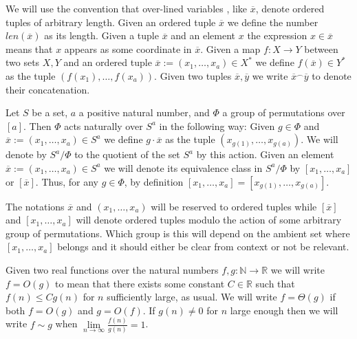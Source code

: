 \documentclass[12pt,notitlepage,a4paper]{article}
\theoremstyle{definition}
\newcommand{\R}{\mathbb{R}}
\newcommand{\N}{\mathbb{N}}
\newcommand{\Ln}{\lim\limits_{n\to \infty}}
\begin{document}
We will use the convention that over-lined variables
, like $\overline{x}$, denote ordered tuples of arbitrary length.
Given an ordered tuple $\overline{x}$
we define the number $len(\overline{x})$ as its length. 
Given a tuple $\overline{x}$ and an element $x$ the expression
$x\in \overline{x}$ means that $x$ appears as some coordinate
in $\overline{x}$. 
Given a map $f:X\rightarrow Y$ between two sets $X, Y$ and 
an ordered tuple $\overline{x}:=(x_1,\dots,x_a)\in X^*$ 
we define $f(\overline{x})\in Y^*$ as the tuple 
$(f(x_1),\dots,f(x_a))$.
Given two tuples $\overline{x},\overline{y}$
we write $\overline{x}^\smallfrown \overline{y}$ to denote their 
concatenation.
\par



Let $S$ be a set, $a$ a positive natural number, 
and $\Phi$ a group of permutations over 
$[a]$. Then $\Phi$ acts naturally over
$S^a$ in the following way: Given $g\in \Phi$ and
$\overline{x}:=(x_1,\dots,x_a)\in S^a$ we define 
$g\cdot \overline{x}$ 
as the tuple $(x_{g(1)},\dots,x_{g(a)})$. 
We will denote by $S^a/\Phi$ to the quotient
of the set $S^a$ by this action. Given an element
$\overline{x}:=(x_1,\dots, x_a)\in S^a$ we will denote its equivalence
class in $S^a/\Phi$ by $[x_1,\dots,x_a]$ or $[\overline{x}]$.
Thus, for any
$g\in \Phi$, by definition $[x_1,\dots,x_a]=[x_{g(1)}
,\dots,x_{g(a)}]$. \par
The notations $\overline{x}$ and
$(x_1,\dots, x_a)$ 
will be reserved 
to ordered tuples while 
$[\overline{x}]$ and
$[x_1,\dots,x_a]$ will denote ordered tuples modulo the
action of some arbitrary group of permutations. Which group is
this will depend on the ambient set where $[x_1,\dots,x_a]$ belongs
and it should either be clear from context or not be relevant.\par

Given two real functions over the natural numbers 
$f,g:\N \rightarrow \R$ we will write $f=O(g)$ to 
mean that there exists some constant $C\in \R$
such that $f(n)\leq Cg(n)$ for $n$ sufficiently large, 
as usual. We will write $f=\Theta(g)$ if both $f=O(g)$ and
$g=O(f)$. If $g(n)\neq 0$ for $n$ large enough then
we will write $f\sim g$ when $\Ln \frac{f(n)}{g(n)}=1$. 

%
\end{document}
